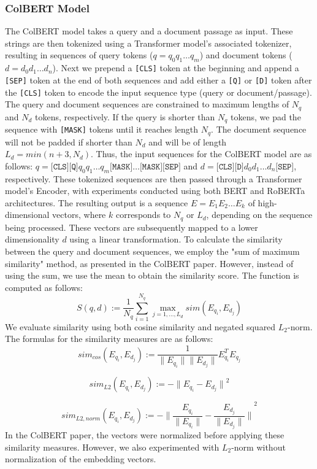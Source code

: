 \documentclass{article}
\begin{document}
\subsubsection{ColBERT Model}
The ColBERT model takes a query and a document passage as input. These strings are then tokenized using a Transformer model's associated tokenizer, resulting in sequences of query tokens ($q = q_0q_1\dots q_m$) and document tokens ($d = d_0d_1\dots d_n$). Next we prepend a \texttt{[CLS]} token at the beginning and append a \texttt{[SEP]} token at the end of both sequences and add either a \texttt{[Q]} or \texttt{[D]} token after the \texttt{[CLS]} token to encode the input sequence type (query or document/passage). The query and document sequences are constrained to maximum lengths of $N_q$ and $N_d$ tokens, respectively. If the query is shorter than $N_q$ tokens, we pad the sequence with \texttt{[MASK]} tokens until it reaches length $N_q$. The document sequence will not be padded if shorter than $N_d$ and will be of length $L_d = min(n + 3, N_d)$. Thus, the input sequences for the ColBERT model are as follows: $q = \texttt{[CLS]}\texttt{[Q]}q_0q_1 \dots q_m\texttt{[MASK]}\dots\texttt{[MASK]}\texttt{[SEP]}$ and $d = \texttt{[CLS]}\texttt{[D]}d_0d_1 \dots d_{n}\texttt{[SEP]}$, respectively. These tokenized sequences are then passed through a Transformer model's Encoder, with experiments conducted using both BERT \cite{devlin2019bert} and RoBERTa \cite{liu2019roberta} architectures. The resulting output is a sequence $E = E_1E_2 \dots E_k$ of high-dimensional vectors, where $k$ corresponds to $N_q$ or $L_d$, depending on the sequence being processed. These vectors are subsequently mapped to a lower dimensionality $d$ using a linear transformation. To calculate the similarity between the query and document sequences, we employ the "sum of maximum similarity" method, as presented in the ColBERT paper. However, instead of using the sum, we use the mean to obtain the similarity score. The function is computed as follows:
$$ S(q,d) := \frac{1}{N_q} \sum_{i=1}^{N_q} \max_{j = 1, \dots, L_d} sim(E_{q_i}, E_{d_j})
$$
We evaluate similarity using both cosine similarity and negated squared $L_2$-norm. The formulas for the similarity measures are as follows:
$$
sim_{cos}(E_{q_i}, E_{d_j}) := \frac{1}{\| E_{q_i} \|\| E_{d_j} \|} E_{q_i}^TE_{q_j} 
$$

$$
sim_{L2}(E_{q_i}, E_{d_j}) := -{\| E_{q_i} -E_{d_j} \|}^2
$$

$$
sim_{L2,norm}(E_{q_i}, E_{d_j}) := -{\| \frac{E_{q_i}}{\| E_{q_i} \|}  - \frac{E_{d_j}}{\| E_{d_j} \|} \|}^2
$$
In the ColBERT paper, the vectors were normalized before applying these similarity measures. However, we also experimented with $L_2$-norm without normalization of the embedding vectors.
\end{document}
